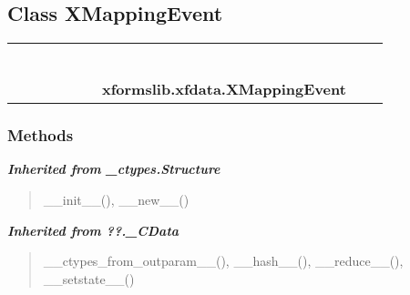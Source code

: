 
\subsection{Class XMappingEvent}

    \label{xformslib:xfdata:XMappingEvent}
\begin{tabular}{cccccccccc}
\multicolumn{2}{r}{\settowidth{\BCL}{object}\multirow{2}{\BCL}{object}}
&&
&&
&&
  \\\cline{3-3}
  &&\multicolumn{1}{c|}{}
&&
&&
&&
  \\
\multicolumn{4}{r}{\settowidth{\BCL}{??.\_CData}\multirow{2}{\BCL}{??.\_CData}}
&&
&&
  \\\cline{5-5}
  &&&&\multicolumn{1}{c|}{}
&&
&&
  \\
\multicolumn{6}{r}{\settowidth{\BCL}{\_ctypes.Structure}\multirow{2}{\BCL}{\_ctypes.Structure}}
&&
  \\\cline{7-7}
  &&&&&&\multicolumn{1}{c|}{}
&&
  \\
&&&&&&\multicolumn{2}{l}{\textbf{xformslib.xfdata.XMappingEvent}}
\end{tabular}



  \subsubsection{Methods}


\large{\textbf{\textit{Inherited from \_ctypes.Structure}}}

\begin{quote}
\_\_init\_\_(), \_\_new\_\_()
\end{quote}

\large{\textbf{\textit{Inherited from ??.\_CData}}}

\begin{quote}
\_\_ctypes\_from\_outparam\_\_(), \_\_hash\_\_(), \_\_reduce\_\_(), \_\_setstate\_\_()
\end{quote}

